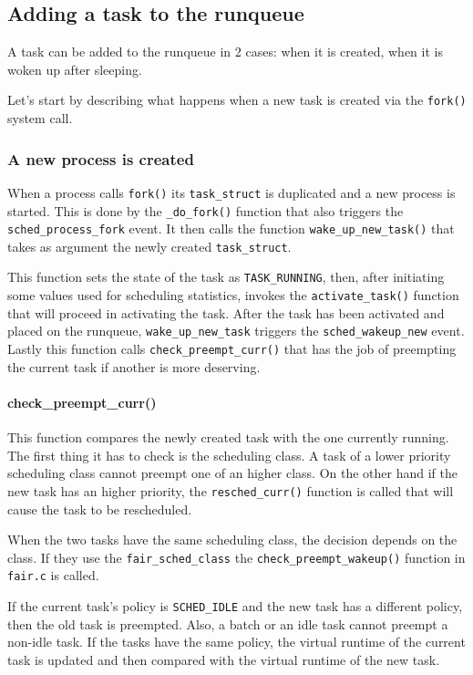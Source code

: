 \subsection{Adding a task to the runqueue}

A task can be added to the runqueue in 2 cases: when it is created, when it is woken up after sleeping.

Let's start by describing what happens when a new task is created via the \verb|fork()| system call.

\subsubsection{A new process is created}
When a process calls \verb|fork()| its \verb|task_struct| is duplicated and a new process is started. This is done by the \verb|_do_fork()| function that also triggers the \verb|sched_process_fork|\label{trace:sched_process_fork} event. It then calls the function \verb|wake_up_new_task()| that takes as argument the newly created \verb|task_struct|.

This function sets the state of the task as \verb|TASK_RUNNING|, then, after initiating some values used for scheduling statistics, invokes the \verb|activate_task()| function that will proceed in activating the task. After the task has been activated and placed on the runqueue, \verb|wake_up_new_task| triggers the \verb|sched_wakeup_new| \label{trace:sched_wakeup_new} event. Lastly this function calls \verb|check_preempt_curr()| that has the job of preempting the current task if another is more deserving. 

\paragraph{check\_preempt\_curr()}\label{check_preempt_curr}
This function compares the newly created task with the one currently running. The first thing it has to check is the scheduling class. A task of a lower priority scheduling class cannot preempt one of an higher class. On the other hand if the new task has an higher priority, the \verb|resched_curr()| function is called that will cause the task to be rescheduled.

When the two tasks have the same scheduling class, the decision depends on the class. If they use the \verb|fair_sched_class| the \newline \verb|check_preempt_wakeup()| function in \verb|fair.c| is called.

If the current task's policy is \verb|SCHED_IDLE| and the new task has a different policy, then the old task is preempted. Also, a batch or an idle task cannot preempt a non-idle task. If the tasks have the same policy, the virtual runtime of the current task is updated and then compared with the virtual runtime of the new task.

